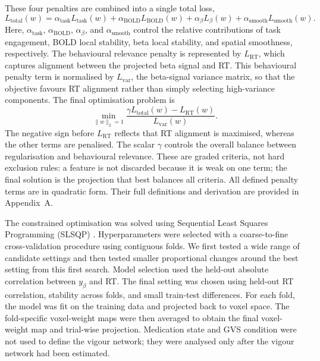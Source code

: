\documentclass[utf8]{FrontiersinHarvard}
\begin{document}
These four penalties are combined into a single total loss,
\begin{equation}
L_{\mathrm{total}}(w)=
\alpha_{\mathrm{task}}L_{\mathrm{task}}(w)+
\alpha_{\mathrm{BOLD}}L_{\mathrm{BOLD}}(w)+
\alpha_{\beta}L_{\beta}(w)+
\alpha_{\mathrm{smooth}}L_{\mathrm{smooth}}(w) .
\end{equation}
Here, \(\alpha_{\mathrm{task}}\), \(\alpha_{\mathrm{BOLD}}\), \(\alpha_{\beta}\), and \(\alpha_{\mathrm{smooth}}\) control the relative contributions of task engagement, BOLD local stability, beta local stability, and spatial smoothness, respectively. The behavioural relevance penalty is represented by \(L_{\mathrm{RT}}\), which captures alignment between the projected beta signal and RT. This behavioural penalty term is normalised by \(L_{\mathrm{var}}\), the beta-signal variance matrix, so that the objective favours RT alignment rather than simply selecting high-variance components. The final optimisation problem is
\begin{equation}
\min_{\|w\|_2=1}
\frac{\gamma L_{\mathrm{total}}(w) - L_{\mathrm{RT}} (w)}
{L_{\mathrm{var}}(w)} .
\end{equation}
The negative sign before \(L_{\mathrm{RT}}\) reflects that RT alignment is maximised, whereas the other terms are penalised. The scalar \(\gamma\) controls the overall balance between regularisation and behavioural relevance. These are graded criteria, not hard exclusion rules: a feature is not discarded because it is weak on one term; the final solution is the projection that best balances all criteria. All defined penalty terms are in quadratic form. Their full definitions and derivation are provided in Appendix~A.

The constrained optimisation was solved using Sequential Least Squares Programming (SLSQP) \citep{nocedal2006numerical,kraft1988software}. Hyperparameters were selected with a coarse-to-fine cross-validation procedure using contiguous folds. We first tested a wide range of candidate settings and then tested smaller proportional changes around the best setting from this first search. Model selection used the held-out absolute correlation between \(y_{\beta}\) and RT. The final setting was chosen using held-out RT correlation, stability across folds, and small train-test differences. For each fold, the model was fit on the training data and projected back to voxel space. The fold-specific voxel-weight maps were then averaged to obtain the final voxel-weight map and trial-wise projection. Medication state and GVS condition were not used to define the vigour network; they were analysed only after the vigour network had been estimated.
\end{document}
